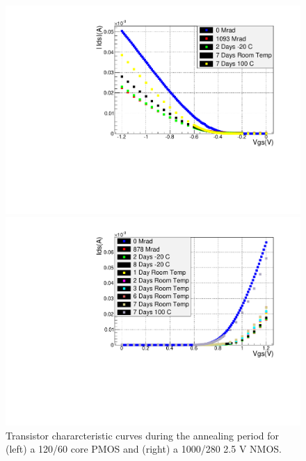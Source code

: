 
\begin{figure}
\begin{minipage}[b]{0.5\textwidth}
	\centering
	\includegraphics[width=\linewidth]{pd012_2_Anneal_comparison_paper.pdf}
\end{minipage}
\hspace{0.5cm}
\begin{minipage}[b]{0.5\textwidth}
	\centering
	\includegraphics[width=\linewidth]{ddg1u_1_Anneal_comparison_paper.pdf}
\end{minipage}
\caption{Transistor chararcteristic curves during the annealing period for (left) a 120/60 core PMOS and (right) a 1000/280 2.5 V NMOS.}
\label{fig:AnnealSuperpositionPlots}
\end{figure}

